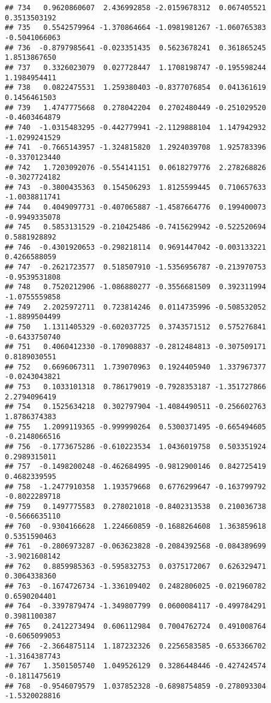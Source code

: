 \documentclass[
]{article}
\begin{document}
\begin{verbatim}
## 734   0.9620860607  2.436992858 -2.0159678312  0.067405521  0.3513503192
## 735   0.5542579964 -1.370864664 -1.0981981267 -1.060765383 -0.5041066063
## 736  -0.8797985641 -0.023351435  0.5623678241  0.361865245  1.8513867650
## 737   0.3326023079  0.027728447  1.1708198747 -0.195598244  1.1984954411
## 738   0.0822475531  1.259380403 -0.8377076854  0.041361619  0.1456461503
## 739   1.4747775668  0.278042204  0.2702480449 -0.251029520 -0.4603464879
## 740  -1.0315483295 -0.442779941 -2.1129888104  1.147942932 -1.0299241529
## 741  -0.7665143957 -1.324815820  1.2924039708  1.925783396 -0.3370123440
## 742   1.7203092076 -0.554141151  0.0618279776  2.278268826 -0.3027724182
## 743  -0.3800435363  0.154506293  1.8125599445  0.710657633 -1.0038811741
## 744   0.4049097731 -0.407065887 -1.4587664776  0.199400073 -0.9949335078
## 745   0.5853131529 -0.210425486 -0.7415629942 -0.522520694  0.5881928892
## 746  -0.4301920653 -0.298218114  0.9691447042 -0.003133221  0.4266588059
## 747  -0.2621723577  0.518507910 -1.5356956787 -0.213970753 -0.9539531808
## 748   0.7520212906 -1.086880277 -0.3556681509  0.392311994 -1.0755559858
## 749   2.2025972711  0.723814246  0.0114735996 -0.508532052 -1.8899504499
## 750   1.1311405329 -0.602037725  0.3743571512  0.575276841 -0.6433750740
## 751   0.4060412330 -0.170908837 -0.2812484813 -0.307509171  0.8189030551
## 752   0.6696067311  1.739070963  0.1924405940  1.337967377 -0.0243043821
## 753   0.1033101318  0.786179019 -0.7928353187 -1.351727866  2.2794096419
## 754   0.1525634218  0.302797904 -1.4084490511 -0.256602763  1.8786374383
## 755   1.2099119365 -0.999990264  0.5300371495 -0.665494605 -0.2148066516
## 756  -0.1773675286 -0.610223534  1.0436019758  0.503351924  0.2989315011
## 757  -0.1498200248 -0.462684995 -0.9812900146  0.842725419  0.4682339595
## 758  -1.2477910358  1.193579668  0.6776299647 -0.163799792 -0.8022289718
## 759   0.1497775583  0.278021018 -0.8402313538  0.210036738 -0.5666635110
## 760  -0.9304166628  1.224660859 -0.1688264608  1.363859618  0.5351590463
## 761  -0.2806973287 -0.063623828 -0.2084392568 -0.084389699 -3.9021608142
## 762   0.8859985363 -0.595832753  0.0375172067  0.626329471  0.3064338360
## 763  -0.1674726734 -1.336109402  0.2482806025 -0.021960782  0.6590204401
## 764  -0.3397879474 -1.349807799  0.0600084117 -0.499784291  0.3981100387
## 765   0.2412273494  0.606112984  0.7004762724  0.491008764 -0.6065099053
## 766  -2.3664875114  1.187232326  0.2256583585 -0.653366702 -1.3164387743
## 767   1.3501505740  1.049526129  0.3286448446 -0.427424574 -0.1811475619
## 768  -0.9546079579  1.037852328 -0.6898754859 -0.278093304 -1.5320028816

\end{verbatim}
\end{document}
